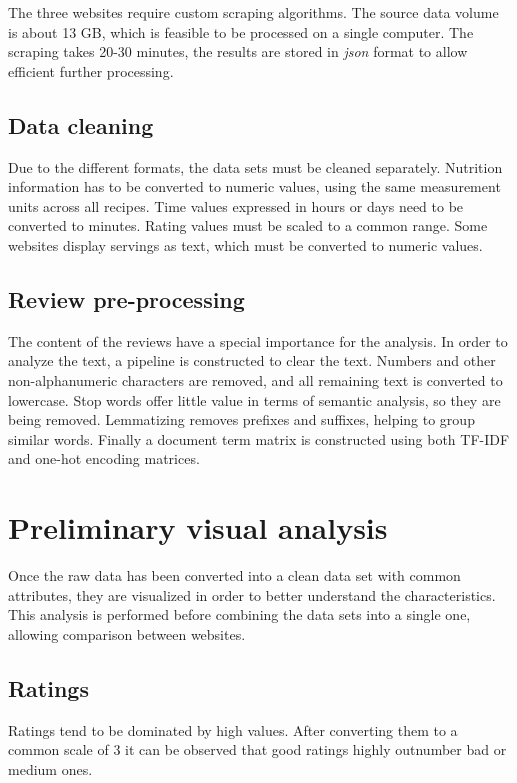 \documentclass[11pt]{article}
\begin{document}
The three websites require custom scraping algorithms. The source data volume is about 13 GB, which is feasible to be processed on a single computer. The scraping takes 20-30 minutes, the results are stored in \textit{json} format to allow efficient further processing.

\subsection{Data cleaning}

Due to the different formats, the data sets must be cleaned separately. Nutrition information has to be converted to numeric values, using the same measurement units across all recipes. Time values expressed in hours or days need to be converted to minutes. Rating values must be scaled to a common range. Some websites display servings as text, which must be converted to numeric values.

\subsection{Review pre-processing}

The content of the reviews have a special importance for the analysis. In order to analyze the text, a pipeline is constructed to clear the text. Numbers and other non-alphanumeric characters are removed, and all remaining text is converted to lowercase. Stop words offer little value in terms of semantic analysis, so they are being removed. Lemmatizing removes prefixes and suffixes, helping to group similar words. Finally a document term matrix is constructed using both TF-IDF and one-hot encoding matrices.

\section{Preliminary visual analysis}

Once the raw data has been converted into a clean data set with common attributes, they are visualized in order to better understand the characteristics. This analysis is performed before combining the data sets into a single one, allowing comparison between websites.

\subsection{Ratings}

Ratings tend to be dominated by high values. After converting them to a common scale of 3 it can be observed that good ratings highly outnumber bad or medium ones.
\end{document}
